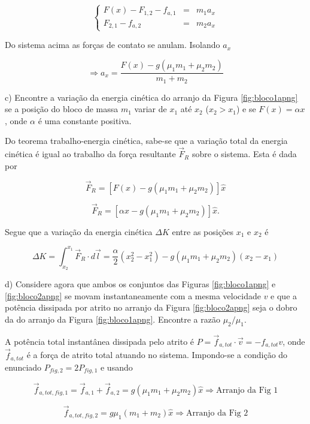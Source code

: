 \begin{enumerate}[start=1,label={\bfseries Q\arabic*.}]
\begin{itemize}
$$
\left\{
\begin{array}{ccc}
	F(x) - F_{1,2} - f_{a,1} & = & m_{1} a_{x} \\
	       F_{2,1} - f_{a,2} & = & m_{2} a_{x}
\end{array}
\right.
$$

Do sistema acima as forças de contato se anulam. Isolando $a_{x}$

$$
\Rightarrow a_{x}  = \frac{F(x) - g(\mu_{1}m_{1} + \mu_{2} m_{2})}{m_{1} + m_{2}}
$$
\end{itemize}

c) Encontre a variação da energia cinética do arranjo da Figura \ref{fig:bloco1apng} se a posição do bloco de massa $m_{1}$ variar de $x_{1}$ até $x_{2}$ ($x_{2} > x_{1}$) e se $F(x) = \alpha x$, onde $\alpha$ é uma constante positiva.

\resposta

Do teorema trabalho-energia cinética, sabe-se que a variação total da energia cinética é igual ao trabalho da força resultante $\vec{F}_{R}$ sobre o sistema. Esta é dada por

$$
\vec{F}_{R} = [F(x) - g(\mu_{1}m_{1} + \mu_{2}m_{2})] \hat{x}
$$

$$
\vec{F}_{R} = [\alpha x - g(\mu_{1}m_{1} + \mu_{2}m_{2})] \hat{x}.
$$

Segue que a variação da energia cinética $\Delta K$ entre as posições $x_{1}$ e $x_{2}$ é

$$
\Delta K = \int_{x_{2}}^{x_{1}} \vec{F}_{R} \cdot d\vec{l} = \frac{\alpha}{2} (x_{2}^{2} - x_{1}^{2}) - g(\mu_{1}m_{1} + \mu_{2}m_{2})(x_{2} - x_{1})
$$

d) Considere agora que ambos os conjuntos das Figuras \ref{fig:bloco1apng} e \ref{fig:bloco2apng} se movam instantaneamente com a mesma velocidade $v$ e que a potência dissipada por atrito no arranjo da Figura \ref{fig:bloco2apng} seja o dobro da do arranjo da Figura \ref{fig:bloco1apng}. Encontre a razão $\mu_{2}/\mu_{1}$.

\resposta

A potência total instantânea dissipada pelo atrito é $P = \vec{f}_{a,tot} \cdot \vec{v} = - f_{a,tot} v$, onde $\vec{f}_{a,tot}$ é a força de atrito total atuando no sistema. Impondo-se a condição do enunciado $P_{fig,2} = 2P_{fig,1}$ e usando

$$
 \vec{f}_{a,tot,fig,1} = \vec{f}_{a,1} + \vec{f}_{a,2} = g(\mu_{1}m_{1} + \mu_{2}m_{2})\hat{x} \Rightarrow \mbox{Arranjo da Fig 1}
$$

$$
 \vec{f}_{a,tot,fig,2} = g\mu_{1}(m_{1} + m_{2}) \hat{x} \Rightarrow \mbox{Arranjo da Fig 2}
$$


\end{enumerate}
